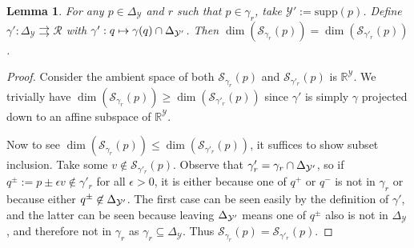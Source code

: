 \documentclass{article}
\newcommand{\Comments}{1}
\newcommand{\mytodo}[2]{\ifnum\Comments=1%
	\todo[linecolor=#1!80!black,backgroundcolor=#1,bordercolor=#1!80!black]{#2}\fi}
\newcommand{\jessiet}[1]{\mytodo{purple!20!white}{JF: #1}}
\newcommand{\reals}{\mathbb{R}}
\newcommand{\simplex}{\Delta_\Y}
\newcommand{\supp}{\mathrm{supp}}
\newcommand{\spn}{\mathrm{span}}
\newcommand{\R}{\mathcal{R}}
\renewcommand{\S}{\mathcal{S}}
\newcommand{\Y}{\mathcal{Y}}
\newcommand{\toto}{\rightrightarrows}
\newtheorem{lemma}{Lemma}
\begin{document}
\begin{lemma}\label{lem:p-boundary-fsd}
	For any $p \in \simplex$ and $r$ such that $p \in \gamma_r$, take $\Y' := \supp(p)$.
	Define $\gamma' : \simplex \toto \R$ with $\gamma' : q \mapsto \gamma(q) \cap \simplexp$.
	Then $\dim(\S_{\gamma_r}(p)) = \dim(\S_{\gamma'_r}(p))$.
\end{lemma}
\begin{proof}
	Consider the ambient space of both $\S_{\gamma_r}(p)$ and $\S_{\gamma'_r}(p)$ is $\reals^\Y$.
	We trivially have $\dim(\S_{\gamma_r}(p)) \geq \dim(\S_{\gamma'_r}(p))$ since $\gamma'$ is simply $\gamma$ projected down to an affine subspace of $\reals^\Y$.
	
	Now to see $\dim(\S_{\gamma_r}(p)) \leq \dim(\S_{\gamma'_r}(p))$, it suffices to show subset inclusion.
	Take some $v \not \in \S_{\gamma'_r}(p)$.
	Observe that $\gamma'_r = \gamma_r \cap \simplexp$, so if $q^\pm := p \pm \epsilon v \not \in \gamma'_r$ for all $\epsilon > 0$, it is either because one of $q^+$ or $q^-$ is not in $\gamma_r$ or because either $q^\pm \not \in \simplexp$.
	The first case can be seen easily by the definition of $\gamma'$, and the latter can be seen because leaving $\simplexp$ means one of $q^\pm$ also is not in $\simplex$, and therefore not in $\gamma_r$ as $\gamma_r \subseteq \simplex$.
	Thus $\S_{\gamma_r}(p) = \S_{\gamma'_r}(p)$.
%	
\end{proof}
\end{document}
